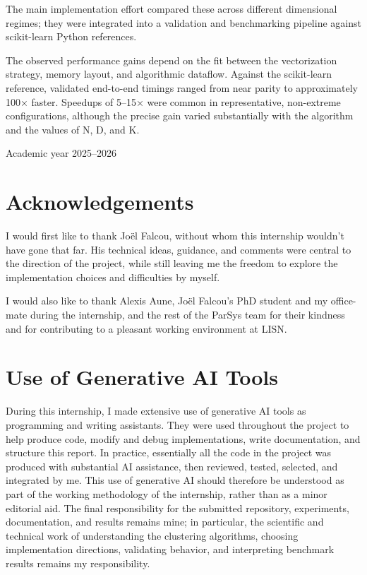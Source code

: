 \documentclass[11pt,a4paper]{article}
\begin{document}
\begin{titlepage}
\begin{minipage}{0.92\textwidth}
      The main implementation effort compared these across different dimensional regimes; they were integrated into a validation and benchmarking pipeline against scikit-learn Python references.
    
      The observed performance gains depend on the fit between the vectorization strategy, memory layout, and algorithmic dataflow. Against the scikit-learn reference, validated end-to-end timings ranged from near parity to approximately 100× faster. Speedups of 5–15× were common in representative, non-extreme configurations, although the precise gain varied substantially with the algorithm and the values of N, D, and K.
    \end{minipage}

  \vfill

  {\large Academic year 2025--2026\par}
\end{titlepage}


\section*{Acknowledgements}

I would first like to thank Joël Falcou, without whom this internship wouldn't have gone that far. His technical ideas, guidance, and comments were central to the direction of the project, while still leaving me the freedom to explore the implementation choices and difficulties by  myself.

I would also like to thank Alexis Aune, Joël Falcou's PhD student and my office-mate during the internship, and the rest of the ParSys team for their kindness and for contributing to a pleasant working environment at LISN.

\section*{Use of Generative AI Tools}

During this internship, I made extensive use of generative AI tools as programming and writing assistants. They were used throughout the project to help produce code, modify and debug implementations, write documentation, and structure this report. In practice, essentially all the code in the project was produced with substantial AI assistance, then reviewed, tested, selected, and integrated by me. This use of generative AI should therefore be understood as part of the working methodology of the internship, rather than as a minor editorial aid. The final responsibility for the submitted repository, experiments, documentation, and results remains mine; in particular, the scientific and technical work of understanding the clustering algorithms, choosing implementation directions, validating behavior, and interpreting benchmark results remains my responsibility.
\end{document}
